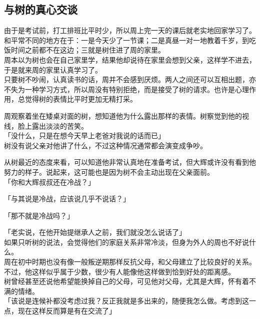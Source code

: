 \subsection{与树的真心交谈}

由于是考试前，打工排班比平时少，所以周上完一天的课后就老实地回家学习了。\\

和平常不同的地方在于：一是今天少了一节课；二是真昼一对一地教着千岁，到吃饭时间之前都不在这边；三就是树住进了周的家里。\\

周本以为树也会在自己家里学，结果他却说待在家里会想到父亲，这样学不进去，于是就来周的家里认真学习了。\\

只要树不吵闹，认真读书的话，周并不会感到厌烦。两人之间还可以互相出题，亦不失为一种学习方式，所以周没有特别拒绝，而是接受了树的请求。也许是心理作用，总觉得树的表情比平时更加无精打采。

周观察着坐在矮桌对面的树，想知道他为什么露出那样的表情。树察觉到他的视线，脸上露出淡淡的苦笑。\\

「没什么，只是在想今天早上老爸对我说的话而已」\\

树没有说父亲对他讲了什么，不过这种情况通常都会演变成争吵。

从树最近的态度来看，可以知道他非常认真地在准备考试，但大辉或许没有看到他努力的样子。说起来，这可能也是因为树不会主动出现在父亲面前。\\

「你和大辉叔叔还在冷战？」

「与其说是冷战，应该说几乎不说话？」

「那不就是冷战吗？」

「老实说，在他开始提继承人之前，我们就没怎么说话了」\\

如果只听树的说法，会觉得他们的家庭关系非常冷淡，但身为外人的周也不好说什么。\\

周在初中时期也没有像一般叛逆期那样反抗父母，和父母建立了比较良好的关系。不过，他这样似乎属于少数，很少有人能像他这样做到恰到好处的距离感。\\

树曾经甚至还说他希望能换掉自己的父母，可见他对父母，尤其是大辉，怀有着不满的情绪。\\

「该说是连候补都没考虑过我？反正我就是多出来的，随便我怎么做。考虑到这一点，现在这样反而算是有在交流了」

